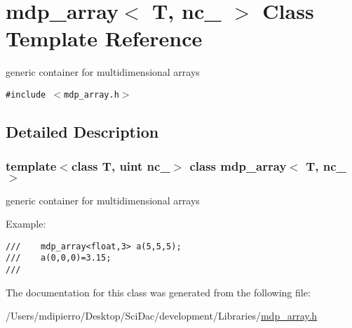 \hypertarget{classmdp__array}{
\section{mdp\_\-array$<$ T, nc\_\- $>$ Class Template Reference}
\label{classmdp__array}
}
generic container for multidimensional arrays  


{\tt \#include $<$mdp\_\-array.h$>$}



\subsection{Detailed Description}
\subsubsection*{template$<$class T, uint nc\_\-$>$ class mdp\_\-array$<$ T, nc\_\- $>$}

generic container for multidimensional arrays 

Example: 

\footnotesize\begin{verbatim}
///    mdp_array<float,3> a(5,5,5);
///    a(0,0,0)=3.15;
/// \end{verbatim}
\normalsize
 

The documentation for this class was generated from the following file:\begin{CompactItemize}
\item 
/Users/mdipierro/Desktop/SciDac/development/Libraries/\hyperlink{mdp__array_8h}{mdp\_\-array.h}\end{CompactItemize}

